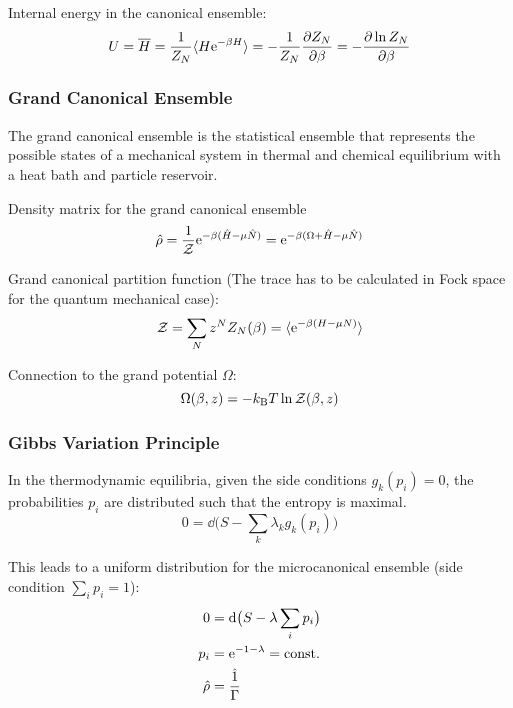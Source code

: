 			\noindent
			Internal energy in the canonical ensemble:
			\begin{equation}
				U = \overline{H} = \frac{1}{Z_N}\langle H\mathrm{e}^{-\beta H}\rangle = -\frac{1}{Z_N}\pdv{Z_N}{\beta} = -\pdv{\ln Z_N}{\beta}
			\end{equation}

		\subsubsection{Grand Canonical Ensemble}
			The grand canonical ensemble is the statistical ensemble that represents the possible states of a mechanical system in thermal and chemical equilibrium with a heat bath and particle reservoir.
			
			Density matrix for the grand canonical ensemble
			\begin{equation}
				\hat{\rho} = \frac{1}{\mathcal{Z}} \mathrm{e}^{-\beta (\hat{H} - \mu \hat{N})}
				= \mathrm{e}^{-\beta (\Omega + \hat{H} - \mu \hat{N})}
			\end{equation}

			Grand canonical partition function (The trace has to be calculated in Fock space for the quantum mechanical case):
			\begin{equation}
				\mathcal{Z} = \sum_N z^N Z_N(\beta) = \langle \mathrm{e}^{-\beta(H-\mu N)} \rangle
			\end{equation}

			\noindent
			Connection to the grand potential $\Omega$:
			\begin{equation}
				\Omega(\beta,z) = -k_{\text{B}} T \ln \mathcal{Z}(\beta,z)
			\end{equation}


		\subsubsection{Gibbs Variation Principle}
			\noindent
			In the thermodynamic equilibria, given the side conditions $g_k(p_i) = 0$, the probabilities $p_i$ are distributed such that the entropy is maximal.
			\begin{equation}
				0 = \dd \big( S - \sum_k \lambda_k g_k(p_i) \big)
			\end{equation}

			\noindent
			This leads to a uniform distribution for the microcanonical ensemble (side condition $\sum_i p_i = 1$):
			\begin{equation}
				\begin{aligned}
					0 &= \dd \big( S - \lambda \sum_i p_i \big) \\
					p_i &= \mathrm{e}^{-1-\lambda} = \mathrm{const.} \\
					\hat{\rho} &= \frac{\hat{1}}{\Gamma} \\ 
				\end{aligned}
			\end{equation}

